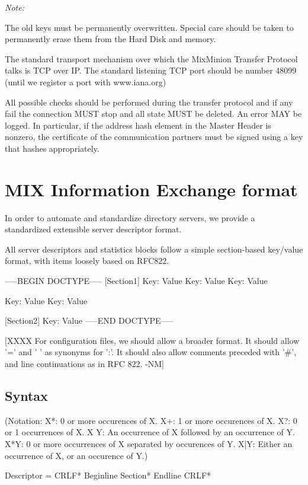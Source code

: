 \emph{Note:}

The old keys must be permanently overwritten. Special care should be
taken to permanently erase them from the Hard Disk and memory. 

The standard transport mechanism over which the MixMinion Transfer
Protocol talks is TCP over IP. The standard listening TCP port should be 
number 48099 (until we register a port with www.iana.org)

All possible checks should be performed during the transfer protocol
and if any fail the connection MUST stop and all state MUST
be deleted. An error MAY be logged. In particular, if the address
hash element in the Master Header is nonzero, the certificate of
the communication partners must be signed using a key that hashes
appropriately.

\section{MIX Information Exchange format}

In order to automate and standardize directory servers, we provide 
a standardized extensible server descriptor format.

All server descriptors and statistics blocks follow a simple
section-based key/value format, with items loosely based on RFC822.

-----BEGIN DOCTYPE-----
[Section1]
Key: Value
Key: Value
Key: Value

Key: Value
Key: Value

[Section2]
Key: Value
-----END DOCTYPE-----

[XXXX For configuration files, we should allow a broader format.  It
  should allow '=' and ' ' as synonyms for ':'.  It should also allow
  comments preceded with '#', and line continuations as in RFC 822. -NM]

\subsection{Syntax}

(Notation:  X*: 0 or more occurences of X.
            X+: 1 or more occurences of X.
	    X?: 0 or 1 occurrences of X.
            X Y: An occurrence of X followed by an occurrence of Y.
	    X*{Y}: 0 or more occurrences of X separated by occurences
                  of Y.
            X|Y: Either an occurrence of X, or an occurence of Y.)

Descriptor = CRLF* Beginline Section* Endline CRLF*


